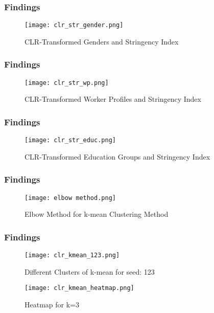 \documentclass[
	11pt, %
]{beamer}
\begin{document}
\begin{frame}
    \frametitle{Findings}
    \begin{figure}
        \centering
        \texttt{[image: clr\_str\_gender.png]}
        \caption{CLR-Transformed Genders and Stringency Index}
        \label{fig:clr_str_gender}
    \end{figure}
\end{frame}


\begin{frame}
    \frametitle{Findings}
    \begin{figure}
        \centering
        \texttt{[image: clr\_str\_wp.png]}
        \caption{CLR-Transformed Worker Profiles and Stringency Index}
        \label{fig:clr_str_wp}
    \end{figure}
\end{frame}


\begin{frame}
    \frametitle{Findings}
    \begin{figure}
        \centering
        \texttt{[image: clr\_str\_educ.png]}
        \caption{CLR-Transformed Education Groups and Stringency Index}
        \label{fig:enter-label}
    \end{figure}
\end{frame}

\begin{frame}
    \frametitle{Findings}
    \begin{figure}
        \centering
        \texttt{[image: elbow method.png]}
        \caption{Elbow Method for k-mean Clustering Method}
        \label{fig:elbow method}
    \end{figure}
\end{frame}

\begin{frame}
    \frametitle{Findings}
    \begin{figure}
        \centering
        \texttt{[image: clr\_kmean\_123.png]}
        \caption{Different Clusters of k-mean for seed: 123}
        \label{fig:clr_kmean_123}
    \end{figure}
\end{frame}

\begin{frame}
    \begin{figure}
        \centering
        \texttt{[image: clr\_kmean\_heatmap.png]}
        \caption{Heatmap for k=3}
        \label{fig:clr_kmean_heatmap}
    \end{figure}
\end{frame}
\end{document}
